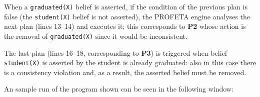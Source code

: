 When a \texttt{graduated(X)} belief is asserted, if the condition of the
previous plan is false (the \texttt{student(X)} belief is not asserted),
the PROFETA engine analyses the next plan (lines
13--14) and executes it; this corresponds to \textbf{P2} whose action
is the removal of \texttt{graduated(X)} since it would be inconsistent.

The last plan (lines 16--18, corresponding to \textbf{P3}) is triggered
when belief \texttt{student(X)} is asserted by the student is already
graduated: also in this case there is a consistency violation and, as a
result, the asserted belief must be removed.

An sample run of the program shown can be seen in the following window:


